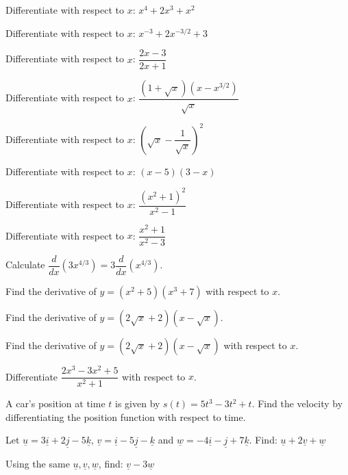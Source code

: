 \documentclass[11pt,a4paper]{article}
\begin{document}
\begin{shortlist}
\item Differentiate with respect to $x$: $x^4+2x^3+x^2$

\item Differentiate with respect to $x$: $x^{-3}+2x^{-3/2}+3$

\item Differentiate with respect to $x$: $\dfrac{2x-3}{2x+1}$

\item Differentiate with respect to $x$: $\dfrac{(1+\sqrt{x})(x-x^{3/2})}{\sqrt{x}}$

\item Differentiate with respect to $x$: $\left(\sqrt{x}-\dfrac{1}{\sqrt{x}}\right)^2$

\item Differentiate with respect to $x$: $(x-5)(3-x)$

\item Differentiate with respect to $x$: $\dfrac{(x^2+1)^2}{x^2-1}$

\item Differentiate with respect to $x$: $\dfrac{x^2+1}{x^2-3}$

\item Calculate $\dfrac{d}{dx}\left(3x^{4/3}\right) = 3\dfrac{d}{dx}\left(x^{4/3}\right)$.

\item Find the derivative of $y=(x^2+5)(x^3+7)$ with respect to $x$.

\item Find the derivative of $y=(2\sqrt{x}+2)(x-\sqrt{x})$.

\item Find the derivative of $y=(2\sqrt{x}+2)(x-\sqrt{x})$ with respect to $x$.

\item Differentiate $\dfrac{2x^3-3x^2+5}{x^2+1}$ with respect to $x$.

\item A car's position at time $t$ is given by $s(t)=5t^3-3t^2+t$. Find the velocity by differentiating the position function with respect to time.

\item Let $\underline{u}=3\underline{i}+2\underline{j}-5\underline{k}$, $\underline{v}=\underline{i}-5\underline{j}-\underline{k}$ and $\underline{w}=-4\underline{i}-\underline{j}+7\underline{k}$. Find: $\underline{u}+2\underline{v}+\underline{w}$

\item Using the same $\underline{u},\underline{v},\underline{w}$, find: $\underline{v}-3\underline{w}$


\end{shortlist}
\end{document}
